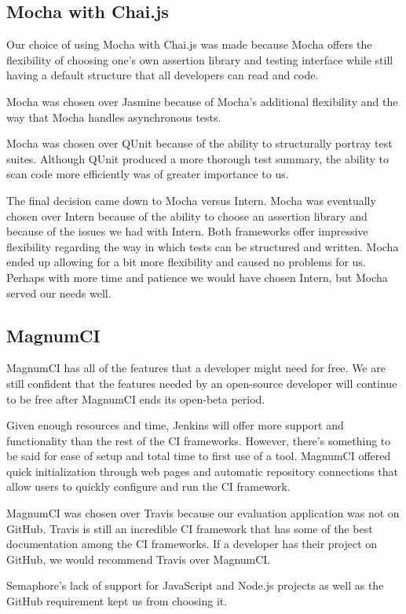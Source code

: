 \documentclass[12pt]{ucthesis}
\begin{document}
\subsection{Mocha with Chai.js}
Our choice of using Mocha with Chai.js was made because Mocha offers the flexibility of choosing one's own assertion library and testing interface while still having a default structure that all developers can read and code.

Mocha was chosen over Jasmine because of Mocha's additional flexibility and the way that Mocha handles asynchronous tests.

Mocha was chosen over QUnit because of the ability to structurally portray test suites. Although QUnit produced a more thorough test summary, the ability to scan code more efficiently was of greater importance to us.

The final decision came down to Mocha versus Intern. Mocha was eventually chosen over Intern because of the ability to choose an assertion library and because of the issues we had with Intern. Both frameworks offer impressive flexibility regarding the way in which tests can be structured and written. Mocha ended up allowing for a bit more flexibility and caused no problems for us. Perhaps with more time and patience we would have chosen Intern, but Mocha served our needs well.

\subsection{MagnumCI}
MagnumCI has all of the features that a developer might need for free. We are still confident that the features needed by an open-source developer will continue to be free after MagnumCI ends its open-beta period.

Given enough resources and time, Jenkins will offer more support and functionality than the rest of the CI frameworks. However, there's something to be said for ease of setup and total time to first use of a tool. MagnumCI offered quick initialization through web pages and automatic repository connections that allow users to quickly configure and run the CI framework.

MagnumCI was chosen over Travis because our evaluation application was not on GitHub. Travis is still an incredible CI framework that has some of the best documentation among the CI frameworks. If a developer has their project on GitHub, we would recommend Travis over MagnumCI.

Semaphore's lack of support for JavaScript and Node.js projects as well as the GitHub requirement kept us from choosing it.
\end{document}
